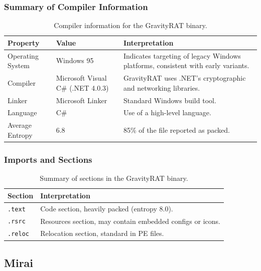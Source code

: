 \documentclass{article}
\begin{document}
\subsubsection{Summary of Compiler Information}
\begin{table}[H]
  \centering
  \begin{tabular}{|p{3cm}|p{3cm}|p{6cm}|}
    \hline
    \textbf{Property} & \textbf{Value} & \textbf{Interpretation} \\
    \hline
    Operating System & Windows 95 & Indicates targeting of legacy Windows platforms, consistent with early variants. \\
    \hline
    Compiler & Microsoft Visual C\# (.NET 4.0.3) & GravityRAT uses .NET’s cryptographic and networking libraries. \\
    \hline
    Linker & Microsoft Linker & Standard Windows build tool. \\
    \hline
    Language & C\# & Use of a high-level language. \\
    \hline
    Average Entropy & 6.8 & 85\% of the file reported as packed.\\
    \hline
  \end{tabular}
  \caption{Compiler information for the GravityRAT binary.}
  \label{tab:gravityrat-compiler}
\end{table}

\subsubsection{Imports and Sections}
\begin{table}[H]
  \centering
  \begin{tabular}{|p{2cm}|p{8cm}|}
    \hline
    \textbf{Section} & \textbf{Interpretation} \\
    \hline
    \texttt{.text} & Code section, heavily packed (entropy 8.0). \\
    \hline
    \texttt{.rsrc} & Resources section, may contain embedded configs or icons.\\
    \hline
    \texttt{.reloc} & Relocation section, standard in PE files. \\
    \hline
  \end{tabular}
  \caption{Summary of sections in the GravityRAT binary.}
  \label{tab:gravityrat-sections}
\end{table}

\subsection{Mirai}
\end{document}
